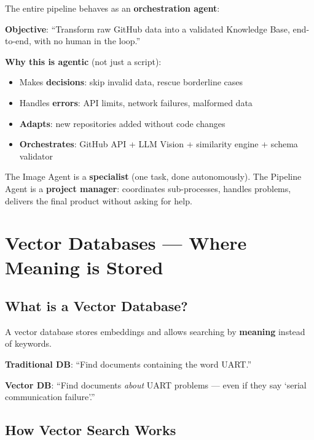 \documentclass[11pt,a4paper]{report}
\begin{document}
The entire pipeline behaves as an \textbf{orchestration agent}:

\textbf{Objective}: ``Transform raw GitHub data into a validated Knowledge Base, end-to-end, with no human in the loop.''

\textbf{Why this is agentic} (not just a script):
\begin{itemize}
    \item Makes \textbf{decisions}: skip invalid data, rescue borderline cases
    \item Handles \textbf{errors}: API limits, network failures, malformed data
    \item \textbf{Adapts}: new repositories added without code changes
    \item \textbf{Orchestrates}: GitHub API + LLM Vision + similarity engine + schema validator
\end{itemize}

\begin{analogybox}
The Image Agent is a \textbf{specialist} (one task, done autonomously). The Pipeline Agent is a \textbf{project manager}: coordinates sub-processes, handles problems, delivers the final product without asking for help.
\end{analogybox}

\chapter{Vector Databases --- Where Meaning is Stored}

\section{What is a Vector Database?}

A vector database stores embeddings and allows searching by \textbf{meaning} instead of keywords.

\textbf{Traditional DB}: ``Find documents containing the word UART.''

\textbf{Vector DB}: ``Find documents \textit{about} UART problems --- even if they say `serial communication failure'.''

\section{How Vector Search Works}
\end{document}

